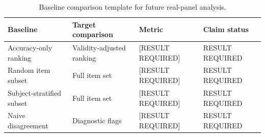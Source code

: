 \begin{table}[t]
\centering
\caption{Baseline comparison template for future real-panel analysis.}
\begin{tabular}{llll}
\toprule
Baseline & Target comparison & Metric & Claim status \\
\midrule
Accuracy-only ranking & Validity-adjusted ranking & [RESULT REQUIRED] & RESULT REQUIRED \\
Random item subset & Full item set & [RESULT REQUIRED] & RESULT REQUIRED \\
Subject-stratified subset & Full item set & [RESULT REQUIRED] & RESULT REQUIRED \\
Naive disagreement & Diagnostic flags & [RESULT REQUIRED] & RESULT REQUIRED \\
\bottomrule
\end{tabular}
\end{table}
